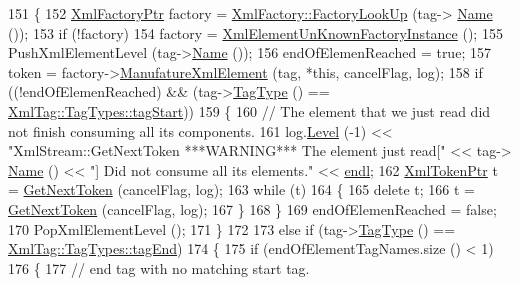 \begin{DoxyCode}
151     \{
152       \hyperlink{class_k_k_b_1_1_xml_factory}{XmlFactoryPtr}  factory = \hyperlink{class_k_k_b_1_1_xml_factory_a1fd2d78a144b13a28c3898e654d79af9}{XmlFactory::FactoryLookUp} (tag->
      \hyperlink{class_k_k_b_1_1_xml_tag_a80934a69d86c1e06b13889fcde99a63b}{Name} ());
153       \textcolor{keywordflow}{if}  (!factory)
154         factory = \hyperlink{namespace_k_k_b_a064ced683cbf54b5cc186bdadd9bda14}{XmlElementUnKnownFactoryInstance}  ();
155       PushXmlElementLevel (tag->\hyperlink{class_k_k_b_1_1_xml_tag_a80934a69d86c1e06b13889fcde99a63b}{Name} ());
156       endOfElemenReached = \textcolor{keyword}{true};
157       token = factory->\hyperlink{class_k_k_b_1_1_xml_factory_a3f4b4f19dee1905e1758b16c66d0112a}{ManufatureXmlElement} (tag, *\textcolor{keyword}{this}, cancelFlag, log);
158       \textcolor{keywordflow}{if}  ((!endOfElemenReached)  &&  (tag->\hyperlink{class_k_k_b_1_1_xml_tag_abe56f7d7b736e627d3a9a584ff965b1e}{TagType} () == 
      \hyperlink{class_k_k_b_1_1_xml_tag_a6c0ef0e23f982f49d55d4fb7eaff6ac9ab02b23b5e15b3a1353771313e1176ce0}{XmlTag::TagTypes::tagStart}))
159       \{
160         \textcolor{comment}{//  The element that we just read did not finish consuming all its components.}
161         log.\hyperlink{class_k_k_b_1_1_run_log_a32cf761d7f2e747465fd80533fdbb659}{Level} (-1) << \textcolor{stringliteral}{"XmlStream::GetNextToken   ***WARNING***   The element just read["} << tag->
      \hyperlink{class_k_k_b_1_1_xml_tag_a80934a69d86c1e06b13889fcde99a63b}{Name} () << \textcolor{stringliteral}{"]  Did not consume all its elements."} << \hyperlink{namespace_k_k_b_ad1f50f65af6adc8fa9e6f62d007818a8}{endl};
162         \hyperlink{class_k_k_b_1_1_xml_token}{XmlTokenPtr}  t = \hyperlink{class_k_k_b_1_1_xml_stream_a87cc738b05c666cf5d5c25beaab477b4}{GetNextToken} (cancelFlag, log);
163         \textcolor{keywordflow}{while}  (t)
164         \{
165           \textcolor{keyword}{delete} t;
166           t = \hyperlink{class_k_k_b_1_1_xml_stream_a87cc738b05c666cf5d5c25beaab477b4}{GetNextToken} (cancelFlag, log);
167         \}
168       \}
169       endOfElemenReached = \textcolor{keyword}{false};
170       PopXmlElementLevel ();
171     \}
172 
173     \textcolor{keywordflow}{else} \textcolor{keywordflow}{if}  (tag->\hyperlink{class_k_k_b_1_1_xml_tag_abe56f7d7b736e627d3a9a584ff965b1e}{TagType} () == \hyperlink{class_k_k_b_1_1_xml_tag_a6c0ef0e23f982f49d55d4fb7eaff6ac9a3ceaa9a790f688ec97a35b5a3fd3b164}{XmlTag::TagTypes::tagEnd})
174     \{
175       \textcolor{keywordflow}{if}  (endOfElementTagNames.size () < 1)
176       \{
177         \textcolor{comment}{// end tag with no matching start tag.}

\end{DoxyCode}
